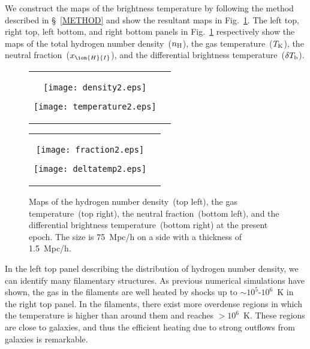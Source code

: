 \documentclass[a4paper,fleqn,usenatbib,useAMS]{mnras}
\begin{document}
We construct the maps of the brightness temperature by following the
method described in \S~\ref{METHOD} and show the resultant maps in Fig.~\ref{fig:z0}.
The left top, right top, left bottom, and right bottom panels in Fig.~\ref{fig:z0}
respectively show the maps of the total hydrogen number density~($n_{\rm H}$), the gas temperature~($T_{\rm K}$), the neutral fraction~($x_{\ion{H}{I}}$), and the differential brightness temperature~($\delta T_{\rm b}$). 
\begin{figure}
  \begin{tabular}{cc}
  \begin{minipage}[b]{0.5\linewidth}
    \centering
    \texttt{[image: density2.eps]}
  \end{minipage}
  \begin{minipage}[b]{0.5\linewidth}
    \centering
    \texttt{[image: temperature2.eps]}
  \end{minipage}
    \end{tabular}
   \begin{tabular}{cc}
  \begin{minipage}[b]{0.5\linewidth}
    \centering
    \texttt{[image: fraction2.eps]}
  \end{minipage}
  \begin{minipage}[b]{0.5\linewidth}
    \centering
    \texttt{[image: deltatemp2.eps]}
  \end{minipage}
  \end{tabular}
  \caption{Maps of the hydrogen number density~(top left), the gas temperature~(top right), 
 the neutral fraction~(bottom left), and the differential brightness temperature~(bottom right) at
 the present epoch. The size is 75~Mpc/h on a side with a thickness of 1.5~Mpc/h. }\label{fig:z0}
\end{figure}

In the left top panel describing the distribution of hydrogen number
density, we can identify many filamentary structures. 
As previous numerical simulations have shown, the gas in the filaments
are well heated by shocks up to $\sim10^5$-$10^6$~K in the right top panel. 
In the filaments, there exist more overdense regions in which the temperature is higher than around them and reaches $>10^6$~K. 
These regions are close to galaxies, and thus the efficient heating due to strong outflows from galaxies is remarkable. 
\end{document}

